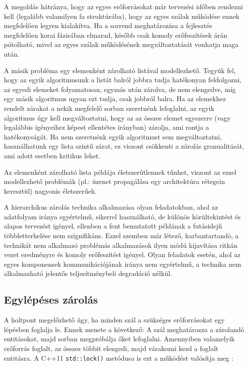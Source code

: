    A megoldás hátránya, hogy az egyes erőforrásokat már tervezési időben rendezni kell (legalább valamilyen fa struktúrába), hogy az egyes szálak működése ennek megfelelően legyen kialakítva. Ha a sorrend meghatározása a fejlesztés megfelelően korai fázisában elmarad, később csak komoly erőfeszítések árán pótolható, mivel az egyes szálak működésének megváltoztatását vonhatja maga után. 
    
    A másik probléma egy elemenként zárolható listával modellezhető. Tegyük fel, hogy az egyik algoritmusunk a listát balról jobbra tudja hatékonyan feldolgozni, az egyedi elemeket folyamatosan, egymás után zárolva, de nem elengedve, míg egy másik algoritmus ugyan ezt tudja, csak jobbról balra. Ha az elemekhez rendelt zárakat a nekik megfelelő sorban szeretnénk lefoglalni, az egyik algoritmus úgy kell megváltoztatni, hogy az az összes elemet egyszerre (vagy legalábbis igényeihez képest ellentétes irányban) zárolja, ami rontja a hatékonyságát. Ha nem szeretnénk egyik algoritmust sem megváltoztatni, használhatunk egy lista szintű zárat, ez viszont csökkenti a zárolás granualitását, ami adott esetben kritikus lehet.
    
    Az elemenként zárolható lista példája életszerűtlennek tűnhet, viszont az ezzel modellezhető problémák (pl.: üzenet propagálása egy architektúra rétegein keresztül) nagyonis életszerűek.
    
    A hierarchikus zárolás technika alkalmazása olyan feladatokban, ahol az adatfolyam iránya egyértelmű, sikerrel használható, de különös körültekintést és alapos tervezést igényel, ellenben a fent bemutatott példának a futásidejű többletterhelése nem szignifikáns. Ezzel szemben már létező, karbantartandó, a technikát nem alkalmazó problémás alkalmazások ilyen módú kijavítása ritkán vezet eredményre és komoly erőfeszítést igényel. Olyan feladatok esetén, ahol az egyes komponensek kommunikációjának iránya nem egyértelmű, a technika nem alkalmazható jelentős teljesítménybeli degradáció nélkül.
    
    \subsection{Egylépéses zárolás}
    \label{seq:onsestep}
    
    A holtpont megelőzhető úgy, ha minden szál a szükséges erőforrásokat egy lépésben foglalja le. Ennek menete a következő: A szál meghatározza a zárolandó entitásokat, majd sorban megpróbálja őket lefoglalni. Amennyiben valamelyik erőforrás foglalt, az összes többit elengedi, majd várakozni kezd a foglalt entitásra. A C++11 \texttt{std::lock()} metódusa is ezt a működést valósítja meg \cite{C++11/lock}:
    
